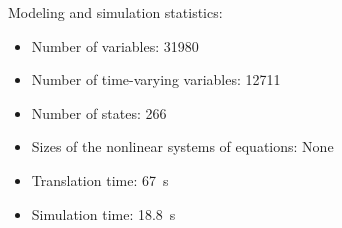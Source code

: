 \begin{contextbox}
  Modeling and simulation statistics:
  \begin{itemize}
    \item Number of variables: 31980
    \item Number of time-varying variables: 12711
    \item Number of states: 266
    \item Sizes of the nonlinear systems of equations: None
    \item Translation time: \SI{67}{s}
    \item Simulation time: \SI{18.8}{s}
  \end{itemize}
\end{contextbox}
